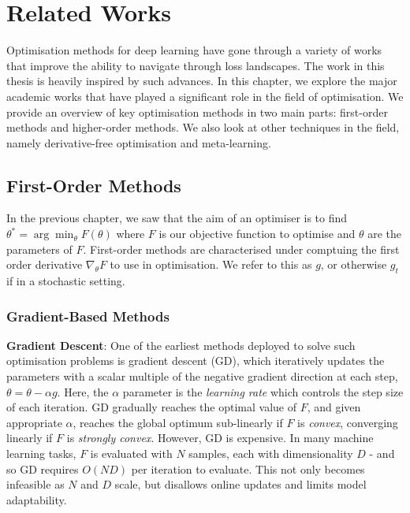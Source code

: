 \chapter{Related Works}
\label{chap:lit_review}


Optimisation methods for deep learning have gone through a variety of works that improve the ability to navigate through loss landscapes.
The work in this thesis is heavily inspired by such advances. In this chapter, we explore the major academic works that have played a significant role in the field of optimisation. We provide an overview of key optimisation methods in two main parts: first-order methods and higher-order methods. We also look at other techniques in the field, namely derivative-free optimisation and meta-learning.

\section{First-Order Methods}
In the previous chapter, we saw that the aim of an optimiser is to find $\theta^* = \arg\min_{\theta} F(\theta)$ where $F$ is our objective function to optimise and $\theta$ are the parameters of $F$. First-order methods are characterised under comptuing the first order derivative $\nabla_{\theta}F$ to use in optimisation. We refer to this as $g$, or otherwise $g_t$ if in a stochastic setting.

\subsection{Gradient-Based Methods}
\textbf{Gradient Descent}: One of the earliest methods deployed to solve such optimisation problems is gradient descent (GD), which iteratively updates the parameters with a scalar multiple of the negative gradient direction at each step, $\theta = \theta - \alpha g$. Here, the $\alpha$ parameter is the \textit{learning rate} which controls the step size of each iteration. GD gradually reaches the optimal value of $F$, and given appropriate $\alpha$, reaches the global optimum sub-linearly if $F$ is \textit{convex}, converging linearly if $F$ is \textit{strongly convex}. However, GD is expensive. In many machine learning tasks, $F$ is evaluated with $N$ samples, each with dimensionality $D$ - and so GD requires $O(ND)$ per iteration to evaluate. This not only becomes infeasible as $N$ and $D$ scale, but disallows online updates and limits model adaptability.

